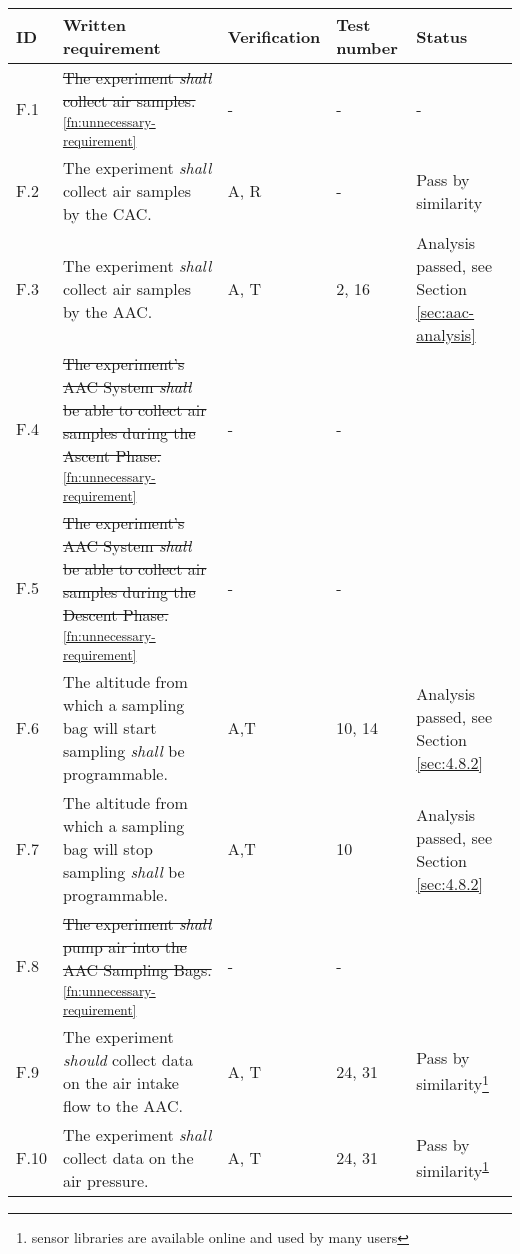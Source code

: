 \makeatletter
\renewcommand\@makefntext[1]{\leftskip=3em\hskip-1em\@makefnmark#1}
\makeatother

\begin{longtable}[]{|m{}| m{} |m{} |m{}|m{}|}

\hline
\textbf{ID}   & \textbf{Written requirement}                                                                                                                                                     & \textbf{Verification} & \textbf{Test number} & \textbf{Status} \\ \hline
F.1  & \st{The experiment \textit{shall} collect air samples.}\textsuperscript{\ref{fn:unnecessary-requirement}}     &- &- &- \\ \hline
F.2  & The experiment \textit{shall} collect air samples by the CAC.&  A, R & - & Pass by similarity \cite{AircoreFlights} \\ \hline
F.3  & The experiment \textit{shall} collect air samples by the AAC. & A, T& 2, 16 & Analysis passed, see Section \ref{sec:aac-analysis}\\ \hline
F.4  & \st{The experiment's AAC System \textit{shall} be able to collect air samples during the Ascent Phase.}\textsuperscript{\ref{fn:unnecessary-requirement}} & - & -& \\ \hline
F.5  & \st{The experiment's AAC System \textit{shall} be able to collect air samples during the Descent Phase.}\textsuperscript{\ref{fn:unnecessary-requirement}} & - & - & \\ \hline
F.6  & The altitude from which a sampling bag will start sampling \textit{shall} be programmable. & A,T&  10, 14  & Analysis passed, see Section \ref{sec:4.8.2}\\ \hline
F.7  & The altitude from which a sampling bag will stop sampling \textit{shall} be programmable.& A,T & 10  & Analysis passed, see Section \ref{sec:4.8.2}\\ \hline
F.8  &\st{The experiment \textit{shall} pump air into the AAC Sampling Bags.}\textsuperscript{\ref{fn:unnecessary-requirement}}  & - & -&\\ \hline
F.9  & The experiment \textit{should} collect data on the air intake flow to the AAC. & A, T & 24, 31 & Pass by similarity\footnote{sensor libraries are available online and used by many users\label{fn:sensor-libraries}}\\ \hline
F.10 & The experiment \textit{shall} collect data on the air pressure. & A, T& 24, 31 & Pass by similarity\textsuperscript{\ref{fn:sensor-libraries}}\\ \hline

\end{longtable}
